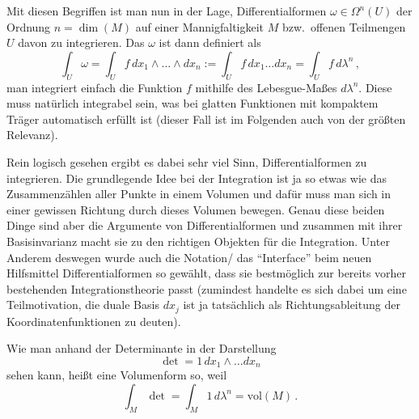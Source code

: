 \documentclass[../H_Analysis_main.tex]{subfiles}
\begin{document}
Mit diesen Begriffen ist man nun in der Lage, Differentialformen $\omega \in \Omega^n(U)$ der Ordnung $n = \dim(M)$ auf einer Mannigfaltigkeit $M$ bzw.~offenen Teilmengen $U$ davon zu integrieren. Das  $\omega$ ist dann definiert als
\begin{equation}
\int_U \omega = \int_U f \, dx_1 \wedge \dots \wedge dx_n := \int_U f \, dx_1 \dots dx_n = \int_U f \, d\lambda^n \, ,
\end{equation}
man integriert einfach die Funktion $f$ mithilfe des Lebesgue-Maßes $d\lambda^n$. Diese muss natürlich integrabel sein, was bei glatten Funktionen mit kompaktem Träger automatisch erfüllt ist (dieser Fall ist im Folgenden auch von der größten Relevanz).

Rein logisch gesehen ergibt es dabei sehr viel Sinn, Differentialformen zu integrieren. Die grundlegende Idee bei der Integration ist ja so etwas wie das Zusammenzählen aller Punkte in einem Volumen und dafür muss man sich in einer gewissen Richtung durch dieses Volumen bewegen. Genau diese beiden Dinge sind aber die Argumente von Differentialformen und zusammen mit ihrer Basisinvarianz macht sie zu den richtigen Objekten für die Integration. Unter Anderem deswegen wurde auch die Notation/ das \enquote{Interface} beim neuen Hilfsmittel Differentialformen so gewählt, dass sie bestmöglich zur bereits vorher bestehenden Integrationstheorie passt (zumindest handelte es sich dabei um eine Teilmotivation, die duale Basis $dx_j$ ist ja tatsächlich als Richtungsableitung der Koordinatenfunktionen zu deuten).



\begin{bsp}
Wie man anhand der Determinante in der Darstellung
\begin{equation*}
\det = 1 \, dx_1 \wedge \dots dx_n
\end{equation*}
sehen kann, heißt eine Volumenform so, weil
\begin{equation}
\int_M \det = \int_M 1 \, d\lambda^n = \text{vol}(M) \, .
\end{equation}
\end{bsp}
\end{document}

